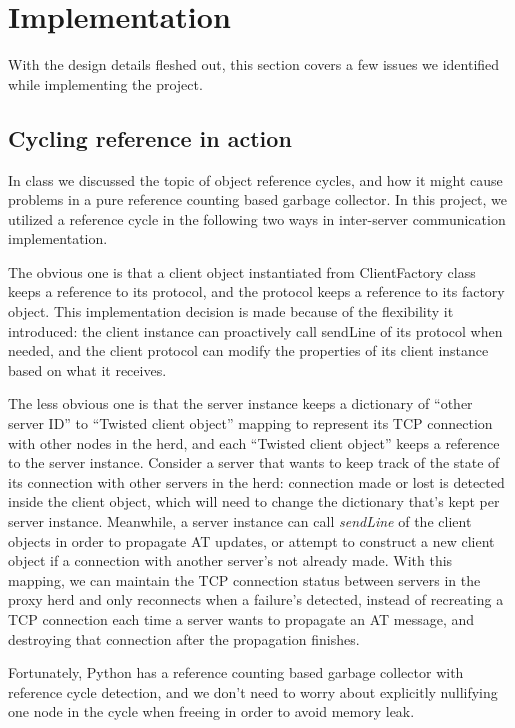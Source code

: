 \documentclass[letterpaper,twocolumn,10pt]{article}
\begin{document}
\section{Implementation}
\label{ImplementationSection}

With the design details fleshed out, this section covers a few issues we identified while implementing the project.

\subsection{Cycling reference in action}

In class we discussed the topic of object reference cycles, and how it might cause problems in a pure reference counting based garbage collector. In this project, we utilized a reference cycle in the following two ways in inter-server communication implementation.

The obvious one is that a client object instantiated from ClientFactory class keeps a reference to its protocol, and the protocol keeps a reference to its factory object. This implementation decision is made because of the flexibility it introduced: the client instance can proactively call sendLine of its protocol when needed, and the client protocol can modify the properties of its client instance based on what it receives.

The less obvious one is that the server instance keeps a dictionary of ``other server ID'' to ``Twisted client object'' mapping to represent its TCP connection with other nodes in the herd, and each ``Twisted client object'' keeps a reference to the server instance. Consider a server that wants to keep track of the state of its connection with other servers in the herd: connection made or lost is detected inside the client object, which will need to change the dictionary that's kept per server instance. Meanwhile, a server instance can call \textit{sendLine} of the client objects in order to propagate AT updates, or attempt to construct a new client object if a connection with another server's not already made. With this mapping, we can maintain the TCP connection status between servers in the proxy herd and only reconnects when a failure's detected, instead of recreating a TCP connection each time a server wants to propagate an AT message, and destroying that connection after the propagation finishes.

Fortunately, Python has a reference counting based garbage collector with reference cycle detection, and we don't need to worry about explicitly nullifying one node in the cycle when freeing in order to avoid memory leak.
\end{document}
